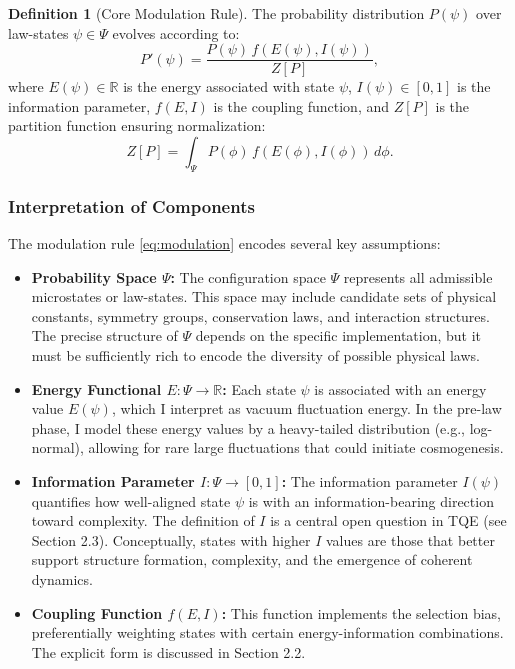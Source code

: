 \documentclass[12pt,a4paper]{article}
\theoremstyle{definition}
\newtheorem{definition}{Definition}[section]
\theoremstyle{remark}
\begin{document}
\begin{definition}[Core Modulation Rule]
The probability distribution $P(\psi)$ over law-states $\psi \in \Psi$ evolves according to:
\begin{equation}\label{eq:modulation}
P'(\psi) = \frac{P(\psi) \, f(E(\psi), I(\psi))}{Z[P]},
\end{equation}
where $E(\psi) \in \mathbb{R}$ is the energy associated with state $\psi$, $I(\psi) \in [0,1]$ is the information parameter, $f(E,I)$ is the coupling function, and $Z[P]$ is the partition function ensuring normalization:
\begin{equation}\label{eq:partition}
Z[P] = \int_\Psi P(\phi) \, f(E(\phi), I(\phi)) \, d\phi.
\end{equation}
\end{definition}

\subsubsection{Interpretation of Components}

The modulation rule \eqref{eq:modulation} encodes several key assumptions:

\begin{itemize}
\item \textbf{Probability Space $\Psi$:} The configuration space $\Psi$ represents all admissible microstates or law-states. This space may include candidate sets of physical constants, symmetry groups, conservation laws, and interaction structures. The precise structure of $\Psi$ depends on the specific implementation, but it must be sufficiently rich to encode the diversity of possible physical laws.

\item \textbf{Energy Functional $E: \Psi \to \mathbb{R}$:} Each state $\psi$ is associated with an energy value $E(\psi)$, which I interpret as vacuum fluctuation energy. In the pre-law phase, I model these energy values by a heavy-tailed distribution (e.g., log-normal), allowing for rare large fluctuations that could initiate cosmogenesis.

\item \textbf{Information Parameter $I: \Psi \to [0,1]$:} The information parameter $I(\psi)$ quantifies how well-aligned state $\psi$ is with an information-bearing direction toward complexity. The definition of $I$ is a central open question in TQE (see Section 2.3). Conceptually, states with higher $I$ values are those that better support structure formation, complexity, and the emergence of coherent dynamics.

\item \textbf{Coupling Function $f(E,I)$:} This function implements the selection bias, preferentially weighting states with certain energy-information combinations. The explicit form is discussed in Section 2.2.
\end{itemize}
\end{document}
